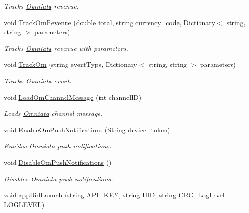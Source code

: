 \begin{DoxyCompactItemize}
\begin{DoxyCompactList}\small\item\em Tracks \hyperlink{class_omniata_s_d_k_1_1_omniata}{Omniata} revenue. \end{DoxyCompactList}\item 
void \hyperlink{class_omniata_s_d_k_1_1_omniata_ac187a0ef974b99a79ad7fd96792d9e14}{Track\+Om\+Revenue} (double total, string currency\+\_\+code, Dictionary$<$ string, string $>$ parameters)
\begin{DoxyCompactList}\small\item\em Tracks \hyperlink{class_omniata_s_d_k_1_1_omniata}{Omniata} revenue with parameters. \end{DoxyCompactList}\item 
void \hyperlink{class_omniata_s_d_k_1_1_omniata_af23be71f9bc730875e366452ea3866ab}{Track\+Om} (string event\+Type, Dictionary$<$ string, string $>$ parameters)
\begin{DoxyCompactList}\small\item\em Tracks \hyperlink{class_omniata_s_d_k_1_1_omniata}{Omniata} event. \end{DoxyCompactList}\item 
void \hyperlink{class_omniata_s_d_k_1_1_omniata_a3ec7dc1f37d98f16c811ce1988dd35b3}{Load\+Om\+Channel\+Message} (int channel\+I\+D)
\begin{DoxyCompactList}\small\item\em Loads \hyperlink{class_omniata_s_d_k_1_1_omniata}{Omniata} channel message. \end{DoxyCompactList}\item 
void \hyperlink{class_omniata_s_d_k_1_1_omniata_a8a8d3860177250a5c95b91a6cac07545}{Enable\+Om\+Push\+Notifications} (String device\+\_\+token)
\begin{DoxyCompactList}\small\item\em Enables \hyperlink{class_omniata_s_d_k_1_1_omniata}{Omniata} push notifications. \end{DoxyCompactList}\item 
void \hyperlink{class_omniata_s_d_k_1_1_omniata_a1c8af86696b87cbcfb9f54dcfe0ae4bd}{Disable\+Om\+Push\+Notifications} ()
\begin{DoxyCompactList}\small\item\em Disables \hyperlink{class_omniata_s_d_k_1_1_omniata}{Omniata} push notifications. \end{DoxyCompactList}\item 
void \hyperlink{class_omniata_s_d_k_1_1_omniata_ab14965769bf1a5b01b5b4c0089dc478f}{app\+Did\+Launch} (string A\+P\+I\+\_\+\+K\+E\+Y, string U\+I\+D, string O\+R\+G, \hyperlink{class_omniata_s_d_k_1_1_omniata_aac4ddf8e7386e787ff7ff8bab48cc6de}{Log\+Level} L\+O\+G\+L\+E\+V\+E\+L)

\end{DoxyCompactItemize}

